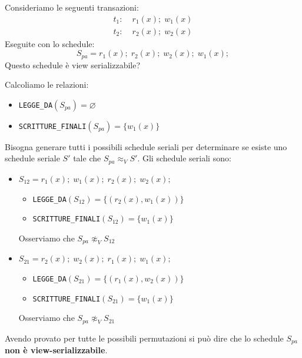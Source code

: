 \documentclass[a4paper]{article}
\begin{document}
\begin{exercise}
  Consideriamo le seguenti transazioni:
  \[
  \begin{aligned}
    t_1:\; & r_1(x); \; w_1(x) \\
    t_2:\; & r_2(x); \; w_2(x)
  \end{aligned}
  \] 
  Eseguite con lo schedule:
  \[
    S_{pa} = r_1(x); \; r_2(x); \; w_2(x); \; w_1(x);
  \] 
  Questo schedule è view serializzabile?

  \vspace{1em}
  \noindent
  Calcoliamo le relazioni:
  \begin{itemize}
    \item \texttt{LEGGE\_DA}\( (S_{pa}) = \varnothing \)
    \item \texttt{SCRITTURE\_FINALI}\( (S_{pa}) = \{ w_1(x) \} \)
  \end{itemize}
  
  \vspace{1em}
  \noindent
  Bisogna generare tutti i possibili schedule seriali per determinare se
  esiste uno schedule seriale \( S' \) tale che \( S_{pa} \approx_V S' \).
  Gli schedule seriali sono:
  \begin{itemize}
    \item \( S_{12} = r_1(x); \; w_1(x); \; r_2(x); \; w_2(x); \) 
      \begin{itemize}
        \item \texttt{LEGGE\_DA}\( (S_{12}) = \{ (r_2(x), w_1(x)) \} \)
        \item \texttt{SCRITTURE\_FINALI}\( (S_{12}) = \{ w_1(x) \} \)
      \end{itemize}
      Osserviamo che \( S_{pa} \not\approx_V S_{12} \)

    \item \( S_{21} = r_2(x); \; w_2(x); \; r_1(x); \; w_1(x); \) 
      \begin{itemize}
        \item \texttt{LEGGE\_DA}\( (S_{21}) = \{ (r_1(x), w_2(x)) \} \)
        \item \texttt{SCRITTURE\_FINALI}\( (S_{21}) = \{ w_1(x) \} \)
      \end{itemize}
      Osserviamo che \( S_{pa} \not\approx_V S_{21} \)
  \end{itemize}
  Avendo provato per tutte le possibili permutazioni si può dire che lo schedule
  \( S_{pa} \) \textbf{non è view-serializzabile}.
\end{exercise}
\end{document}

